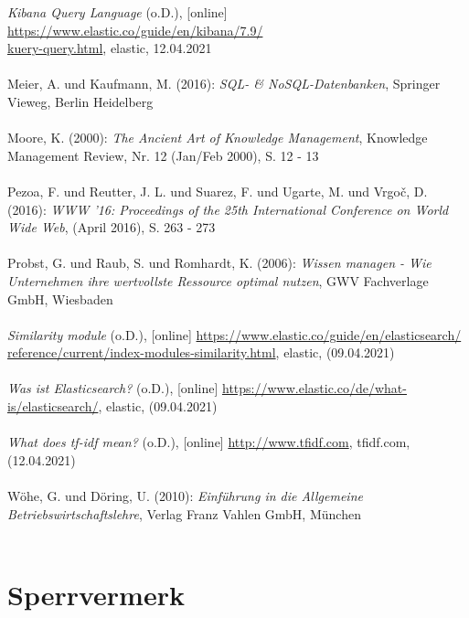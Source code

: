 \documentclass[a4paper]{scrartcl}
\begin{document}
\textit{Kibana Query Language} (o.D.), [online] \href{https://www.elastic.co/guide/en/kibana/7.9/kuery-query.html}{https://www.elastic.co/guide/en/kibana/7.9/ \\ kuery-query.html}, elastic, 12.04.2021 \\ \\
Meier, A. und Kaufmann, M. (2016): \textit{SQL- \& NoSQL-Datenbanken}, Springer Vieweg, Berlin Heidelberg \\ \\
Moore, K. (2000): \textit{The Ancient Art of Knowledge Management}, Knowledge Management Review, Nr. 12 (Jan/Feb 2000), S. 12 - 13 \\ \\
Pezoa, F. und Reutter, J. L. und Suarez, F. und Ugarte, M. und Vrgoč, D. (2016): \textit{WWW '16: Proceedings of the 25th International Conference on World Wide Web}, (April 2016), S. 263 - 273 \\ \\
Probst, G. und Raub, S. und Romhardt, K. (2006): \textit{Wissen managen - Wie Unternehmen ihre wertvollste Ressource optimal nutzen}, GWV Fachverlage GmbH, Wiesbaden \\ \\
\textit{Similarity module} (o.D.), [online] \href{https://www.elastic.co/guide/en/elasticsearch/reference/current/index-modules-similarity.html}{https://www.elastic.co/guide/en/elasticsearch/ \\ reference/current/index-modules-similarity.html}, elastic, (09.04.2021) \\ \\
\textit{Was ist Elasticsearch?} (o.D.), [online] \href{https://www.elastic.co/de/what-is/elasticsearch/}{https://www.elastic.co/de/what-is/elasticsearch/}, elastic, (09.04.2021) \\ \\
\textit{What does tf-idf mean?} (o.D.), [online] \href{http://www.tfidf.com}{http://www.tfidf.com}, tfidf.com, (12.04.2021) \\ \\
Wöhe, G. und Döring, U. (2010): \textit{Einführung in die Allgemeine Betriebswirtschaftslehre}, Verlag Franz Vahlen GmbH, München \\ \\



\newpage

\section*{Sperrvermerk}
\end{document}
